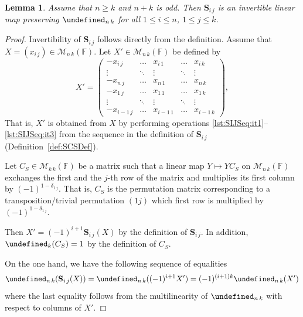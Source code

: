 \documentclass{elsarticle}
\def\F{{\mathbb F}}
\def\M{{\mathcal M}}
\def\SCS{{\mathbf S}}
\let\det\undefined
\DeclareMathOperator{\det}{det}
\theoremstyle{plain}
\newtheorem{lemma}[theorem]{Lemma}
\theoremstyle{definition}
\numberwithin{equation}{section}
\begin{document}
\begin{lemma}\label{lem:ReduceTo11ByShiftOdd}Assume that $n \ge k$ and $n + k$ is odd. Then $\SCS_{i\,j}$ is an invertible linear map preserving $\det_{n\,k}$ for all $1 \le i \le n$, $1 \le j \le k$.
\end{lemma}
\begin{proof}Invertibility of $\SCS_{i\,j}$ follows directly from the definition. Assume that $X = (x_{i\,j}) \in \M_{n\,k}(\F)$. Let $X' \in \M_{n\,k}(\F)$ be defined by 
\[
X' = 
\begin{pmatrix}
-x_{i\, j} & \ldots & x_{i\,1} & \ldots & x_{i\, k}\\
\vdots & \ddots & \vdots & \ddots  & \vdots\\
-x_{n\, j} & \ldots & x_{n\,1} & \ldots & x_{n\, k}\\
-x_{1\, j} & \ldots &  x_{1\,1} & \ldots & x_{1\, k}\\
\vdots & \ddots & \vdots & \ddots & \vdots\\
-x_{i-1\, j} & \ldots & x_{i-1\,1} & \ldots &  x_{i-1\, k}
\end{pmatrix},
\]
That is, $X'$ is obtained from $X$ by performing operations \ref{lst:SIJSeq:it1}--\ref{lst:SIJSeq:it3} from the sequence in the definition of $\SCS_{i\,j}$ (Definition~\ref{def:SCSDef}).

Let $C_{S} \in \M_{k\,k}(\F)$ be a matrix such that a linear map $Y \mapsto YC_S$ on $\M_{n\,k}(\F)$ exchanges the first and the $j$-th row of the matrix and multiplies its first column by $(-1)^{1 - \delta_{1\,j}}$. That is, $C_S$ is the permutation matrix corresponding to a transposition/trivial permutation $(1j)$ which first row is multiplied by $(-1)^{1 - \delta_{1\,j}}$. 

Then $X' = (-1)^{i+1}\SCS_{i\,j}(X)$ by the definition of $\SCS_{i\,j}$. In addition, $\det_k(C_S) = 1$ by the definition of $C_S$. 

On the one hand, we have the following sequence of equalities
\begin{equation}\label{lem:ReduceTo11ByShiftOdd:eq1}
\det_{n\,k}(\SCS_{i\,j}(X)) = \det_{n\,k}((-1)^{i+1}X') = (-1)^{(i+1)k}\det_{n\,k}(X')
\end{equation}
where the last equality follows from the multilinearity of $\det_{n\,k}$ with respect to columns of $X'$.


\end{proof}
\end{document}
